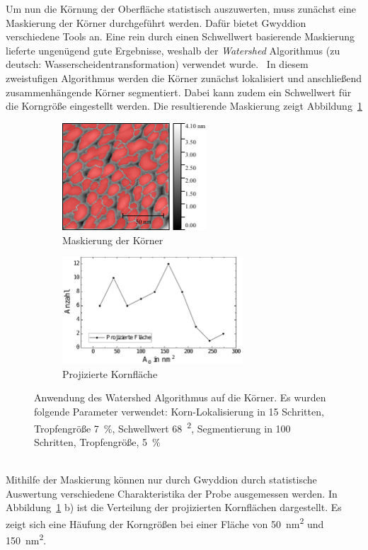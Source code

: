 \documentclass[a4paper,twoside,final]{article}
\begin{document}
Um nun die Körnung der Oberfläche statistisch auszuwerten, muss zunächst eine Maskierung der Körner durchgeführt werden. Dafür bietet Gwyddion verschiedene Tools an. Eine rein durch einen Schwellwert basierende Maskierung lieferte ungenügend gute Ergebnisse, weshalb der \textit{Watershed} Algorithmus (zu deutsch: Wasserscheidentransformation) verwendet wurde.~\cite{Gwyddion_documentation} In diesem zweistufigen Algorithmus werden die Körner zunächst lokalisiert und anschließend zusammenhängende Körner segmentiert. Dabei kann zudem ein Schwellwert für die Korngröße eingestellt werden. Die resultierende Maskierung zeigt Abbildung~\ref{fig:Kornflaechen}
\begin{figure}[htp]
    \centering
    \begin{subfigure}{0.45\textwidth}
        \includegraphics[height=4cm]{Bilder/Image01963_Korngroessen.pdf}
        \caption{Maskierung der Körner}
    \end{subfigure}
    \hspace{0.5cm}
    \begin{subfigure}{0.45\textwidth}
        \includegraphics[height=4cm]{Bilder/Image01963_ProjizierteFlaeche.pdf}
        \caption{Projizierte Kornfläche}
    \end{subfigure}
    \caption{Anwendung des Watershed Algorithmus auf die Körner. Es wurden folgende Parameter verwendet: Korn-Lokalisierung in 15 Schritten, Tropfengröße \SI{7}{\percent}, Schwellwert \SI{68}{\squared}, Segmentierung in 100 Schritten, Tropfengröße, \SI{5}{\percent}}
    \label{fig:Kornflaechen}
\end{figure}\\
Mithilfe der Maskierung können nur durch Gwyddion durch statistische Auswertung verschiedene Charakteristika der Probe ausgemessen werden. In Abbildung~\ref{fig:Kornflaechen} b) ist die Verteilung der projizierten Kornflächen dargestellt. Es zeigt sich eine Häufung der Korngrößen bei einer Fläche von \SI{50}{\nano\metre\squared} und \SI{150}{\nano\metre\squared}.\\
\end{document}

